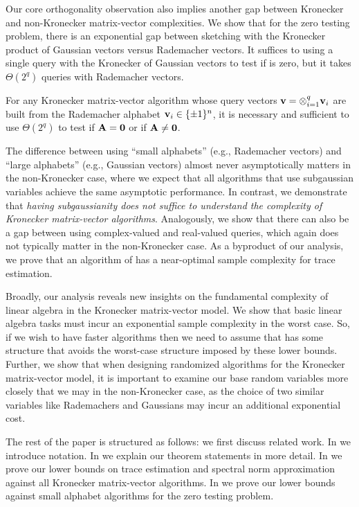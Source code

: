 Our core orthogonality observation also implies another gap between Kronecker and non-Kronecker matrix-vector complexities.
We show that for the zero testing problem, there is an exponential gap between sketching with the Kronecker product of Gaussian vectors versus Rademacher vectors.
It suffices to using a single query with the Kronecker of Gaussian vectors to test if \mA is zero, but it takes \(\Theta(2^q)\) queries with Rademacher vectors.
\begin{theorem}
    For any Kronecker matrix-vector algorithm whose query vectors \(\boldsymbol{\mathrm{v}} = \otimes_{i=1}^q \boldsymbol{\mathrm{v}}_i\) are built from the Rademacher alphabet \(\boldsymbol{\mathrm{v}}_i \in \{\pm1\}^n\), it is necessary and sufficient to use \(\Theta(2^q)\) to test if \(\mathbf{A} = \mathbf{0}\) or if \(\mathbf{A} \neq \mathbf{0}\).
\end{theorem}
The difference between using ``small alphabets'' (e.g., Rademacher vectors) and ``large alphabets'' (e.g., Gaussian vectors) almost never asymptotically matters in the non-Kronecker case, where we expect that all algorithms that use subgaussian variables achieve the same asymptotic performance.
In contrast, we demonstrate that \emph{having subgaussianity does not suffice to understand the complexity of Kronecker matrix-vector algorithms}.
Analogously, we show that there can also be a gap between using complex-valued and real-valued queries, which again does not typically matter in the non-Kronecker case.
As a byproduct of our analysis, we prove that an algorithm of \cite{meyer2023hutchinson} has a near-optimal sample complexity for trace estimation.


Broadly, our analysis reveals new insights on the fundamental complexity of linear algebra in the Kronecker matrix-vector model.
We show that basic linear algebra tasks must incur an exponential sample complexity in the worst case.
So, if we wish to have faster algorithms then we need to assume that \mA has some structure that avoids the worst-case structure imposed by these lower bounds.
Further, we show that when designing randomized algorithms for the Kronecker matrix-vector model, it is important to examine our base random variables more closely that we may in the non-Kronecker case, as the choice of two similar variables like Rademachers and Gaussians may incur an additional exponential cost.

The rest of the paper is structured as follows:
we first discuss related work.
In  we introduce notation.
In  we explain our theorem statements in more detail.
In  we prove our lower bounds on trace estimation and spectral norm approximation against all Kronecker matrix-vector algorithms.
In  we prove our lower bounds against small alphabet algorithms for the zero testing problem.

